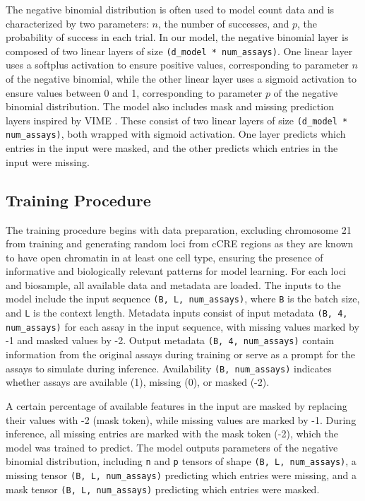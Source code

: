 \documentclass[twoside,11pt]{article}
\begin{document}
The negative binomial distribution is often used to model count data and is characterized by two parameters: \(n\), the number of successes, and \(p\), the probability of success in each trial. In our model, the negative binomial layer is composed of two linear layers of size \texttt{(d\_model * num\_assays)}. One linear layer uses a softplus activation to ensure positive values, corresponding to parameter \(n\) of the negative binomial, while the other linear layer uses a sigmoid activation to ensure values between 0 and 1, corresponding to parameter \(p\) of the negative binomial distribution. The model also includes mask and missing prediction layers inspired by VIME . These consist of two linear layers of size \texttt{(d\_model * num\_assays)}, both wrapped with sigmoid activation. One layer predicts which entries in the input were masked, and the other predicts which entries in the input were missing.

\subsection{Training Procedure}

The training procedure begins with data preparation, excluding chromosome 21 from training and generating random loci from cCRE regions as they are known to have open chromatin in at least one cell type, ensuring the presence of informative and biologically relevant patterns for model learning. For each loci and biosample, all available data and metadata are loaded. The inputs to the model include the input sequence \texttt{(B, L, num\_assays)}, where \texttt{B} is the batch size, and \texttt{L} is the context length. Metadata inputs consist of input metadata \texttt{(B, 4, num\_assays)} for each assay in the input sequence, with missing values marked by -1 and masked values by -2. Output metadata \texttt{(B, 4, num\_assays)} contain information from the original assays during training or serve as a prompt for the assays to simulate during inference. Availability \texttt{(B, num\_assays)} indicates whether assays are available (1), missing (0), or masked (-2).

A certain percentage of available features in the input are masked by replacing their values with -2 (mask token), while missing values are marked by -1. During inference, all missing entries are marked with the mask token (-2), which the model was trained to predict. The model outputs parameters of the negative binomial distribution, including \texttt{n} and \texttt{p} tensors of shape \texttt{(B, L, num\_assays)}, a missing tensor \texttt{(B, L, num\_assays)} predicting which entries were missing, and a mask tensor \texttt{(B, L, num\_assays)} predicting which entries were masked.
\end{document}
